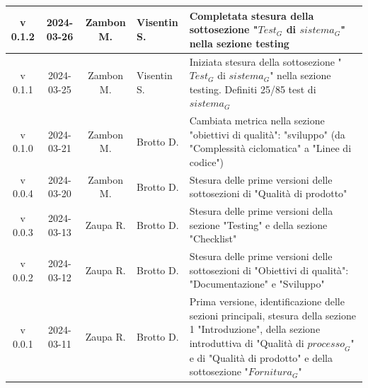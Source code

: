 \documentclass[12pt, oneside]{article}
\begin{document}
\begin{longtable}{|c|c|c|p{3cm}|p{6cm}|}
\hline
v 0.1.2 & 2024-03-26 & Zambon M. & Visentin S. & Completata stesura della sottosezione "$\textit{Test}_G$ di $\textit{sistema}_G$" nella sezione testing\\
\hline
v 0.1.1 & 2024-03-25 & Zambon M. & Visentin S. & Iniziata stesura della sottosezione "$\textit{Test}_G$ di $\textit{sistema}_G$" nella sezione testing. Definiti 25/85 test di $\textit{sistema}_G$\\
\hline
v 0.1.0 & 2024-03-21 & Zambon M. & Brotto D. & Cambiata metrica nella sezione "obiettivi di qualità": "sviluppo" (da "Complessità ciclomatica" a "Linee di codice")\\
\hline
v 0.0.4 & 2024-03-20 & Zambon M. & Brotto D. & Stesura delle prime versioni delle sottosezioni di "Qualità di prodotto"\\
\hline
v 0.0.3 & 2024-03-13 & Zaupa R. & Brotto D. & Stesura delle prime versioni della sezione "Testing" e della sezione "Checklist"\\
\hline
v 0.0.2 & 2024-03-12 & Zaupa R. & Brotto D. & Stesura delle prime versioni delle sottosezioni di "Obiettivi di qualità": "Documentazione" e "Sviluppo"\\
\hline
v 0.0.1 & 2024-03-11 & Zaupa R. & Brotto D. & Prima versione, identificazione delle sezioni principali, stesura della sezione 1 "Introduzione", della sezione introduttiva di "Qualità di $\textit{processo}_G$" e di "Qualità di prodotto" e della sottosezione "$\textit{Fornitura}_G$" \\
\hline
\end{longtable}
\newpage


\tableofcontents
\newpage

\newpage

\newpage

\newpage

\newpage

\newpage

\end{document}

